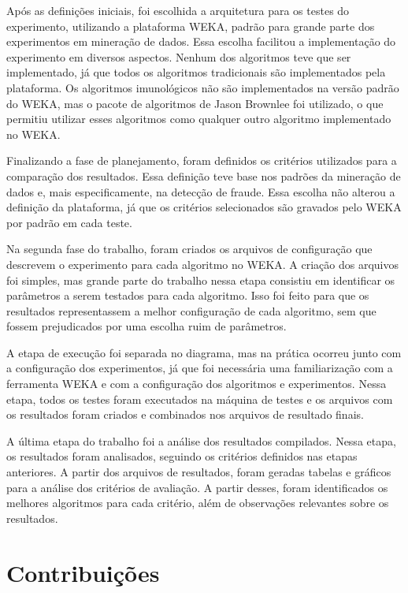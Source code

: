 Após as definições iniciais, foi escolhida a arquitetura para os testes do experimento, utilizando a plataforma WEKA, padrão para grande parte dos experimentos em mineração de dados. Essa escolha facilitou a implementação do experimento em diversos aspectos. Nenhum dos algoritmos teve que ser implementado, já que todos os algoritmos tradicionais são implementados pela plataforma. Os algoritmos imunológicos não são implementados na versão padrão do WEKA, mas o pacote de algoritmos de Jason Brownlee foi utilizado, o que permitiu utilizar esses algoritmos como qualquer outro algoritmo implementado no WEKA.

Finalizando a fase de planejamento, foram definidos os critérios utilizados para a comparação dos resultados. Essa definição teve base nos padrões da mineração de dados e, mais especificamente, na detecção de fraude. Essa escolha não alterou a definição da plataforma, já que os critérios selecionados são gravados pelo WEKA por padrão em cada teste.

Na segunda fase do trabalho, foram criados os arquivos de configuração que descrevem o experimento para cada algoritmo no WEKA. A criação dos arquivos foi simples, mas grande parte do trabalho nessa etapa consistiu em identificar os parâmetros a serem testados para cada algoritmo. Isso foi feito para que os resultados representassem a melhor configuração de cada algoritmo, sem que fossem prejudicados por uma escolha ruim de parâmetros.

A etapa de execução foi separada no diagrama, mas na prática ocorreu junto com a configuração dos experimentos, já que foi necessária uma familiarização com a ferramenta WEKA e com a configuração dos algoritmos e experimentos. Nessa etapa, todos os testes foram executados na máquina de testes e os arquivos com os resultados foram criados e combinados nos arquivos de resultado finais.

A última etapa do trabalho foi a análise dos resultados compilados. Nessa etapa, os resultados foram analisados, seguindo os critérios definidos nas etapas anteriores. A partir dos arquivos de resultados, foram geradas tabelas e gráficos para a análise dos critérios de avaliação. A partir desses, foram identificados os melhores algoritmos para cada critério, além de observações relevantes sobre os resultados.

\section{Contribuições}

